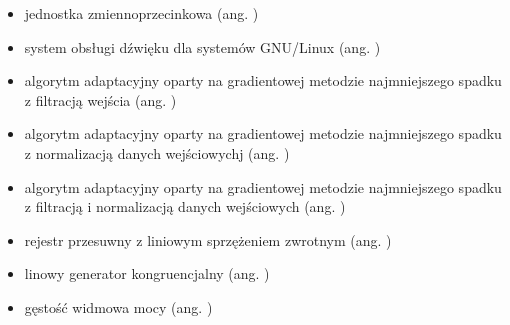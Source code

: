 \begin{itemize}
\item[FPU] jednostka zmiennoprzecinkowa (ang. )
\item[ALSA] system obsługi dźwięku dla systemów GNU/Linux (ang.
)
\item[FXLMS] algorytm adaptacyjny oparty na gradientowej metodzie najmniejszego
    spadku z filtracją wejścia (ang. ) 
\item[NLMS] algorytm adaptacyjny oparty na gradientowej metodzie najmniejszego
    spadku z normalizacją danych wejściowychj (ang. )
\item[FXNLMS] algorytm adaptacyjny oparty na gradientowej metodzie najmniejszego
spadku z filtracją i normalizacją danych wejściowych (ang. )
\item[LFSR] rejestr przesuwny z liniowym sprzężeniem zwrotnym (ang.
)
\item[LCG] linowy generator kongruencjalny (ang. )
\item[PSD] gęstość widmowa mocy (ang. )

 
\end{itemize}
